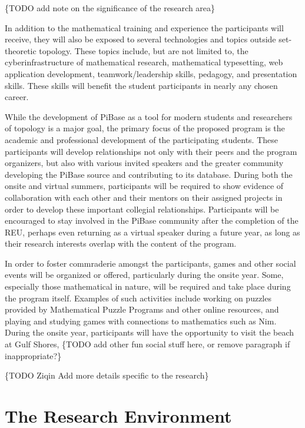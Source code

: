 \{TODO add note on the significance of the research area\}

In addition to the mathematical training and experience the participants will
receive, they will also be exposed to several technologies and topics outside
set-theoretic topology. These topics include, but are not limited to,
the cyberinfrastructure of mathematical research, mathematical typesetting,
web application development, teamwork/leadership skills, pedagogy,
and presentation skills. These skills will benefit the student participants
in nearly any chosen career.

While the development of PiBase as a tool for modern students and researchers
of topology is a major goal, the primary focus of the proposed program
is the academic and professional development of the participating students.
These participants will develop relationships not only with their peers
and the program organizers, but also with various invited speakers and
the greater community developing the PiBase source and contributing to its
database. During both the onsite and virtual summers, participants will be
required to show evidence of collaboration with
each other and their mentors on their assigned projects in order
to develop these important collegial relationships. Participants will be
encouraged to stay involved in the PiBase community after the completion
of the REU, perhaps even returning as a virtual speaker during a future year,
as long as their research interests overlap with the content of the program.

In order to foster commraderie amongst the participants, games and other
social events will be organized or offered, particularly during the onsite year.
Some, especially those mathematical in nature, will be required and take place
during the program itself. Examples of such activities include working on
puzzles provided by Mathematical Puzzle Programs and other online resources,
and playing and studying games with connections to mathematics such as Nim.
During the onsite year, participants will have the opportunity to visit
the beach at Gulf Shores, \{TODO add other fun social stuff here, or remove
paragraph if inappropriate?\}

\{TODO Ziqin Add more details specific to the research\}

\section{The Research Environment}

